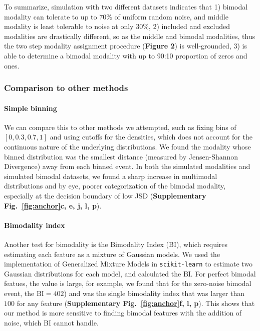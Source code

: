 To summarize, simulation with two different datasets indicates that 1) bimodal modality can tolerate to up to $70\%$ of uniform random noise, and middle modality is least tolerable to noise at only $30\%$, 2) included and excluded modalities are drastically different, so as the middle and bimodal modalities, thus the two step modality assignment procedure (\textbf{Figure 2}) is well-grounded, 3) \anchor is able to determine a bimodal modality with up to 90:10 proportion of zeros and ones.

\subsubsection{Comparison to other methods}

\paragraph{Simple binning} 
We can compare this to other methods we attempted, such as fixing bins of $[0, 0.3, 0.7, 1]$ and using cutoffs for the densities, which does not account for the continuous nature of the underlying distributions. We found the modality whose binned distribution was the smallest distance (measured by Jensen-Shannon Divergence\cite{Anonymous:2011vn}) away from each binned event. In both the simulated modalities and simulated bimodal datasets, we found a sharp increase in multimodal distributions and by eye, poorer categorization of the bimodal modality, especially at the decision boundary of low JSD (\textbf{Supplementary Fig.~\ref{fig:anchor}c, e, j, l, p}).



\paragraph{Bimodality index}
Another test for bimodality is the Bimodality Index\cite{Wang:2009wm} (BI), which requires estimating each feature as a mixture of Gaussian models. We used the implementation of Generalized Mixture Models in \texttt{scikit-learn}\cite{Pedregosa:2011tv} to estimate two Gaussian distributions for each model, and calculated the BI. For perfect bimodal featues, the value is large, for example, we found that for the zero-noise bimodal event, the $\mathrm{BI}=402$) and was the single bimodality index that was larger than $100$ for any feature (\textbf{Supplementary Fig.~\ref{fig:anchor}f, l, p}). This shows that our method is more sensitive to finding bimodal features with the addition of noise, which BI cannot handle.

